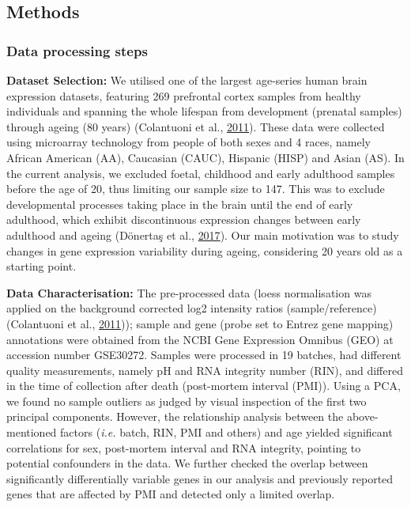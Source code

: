 \documentclass[12pt,twoside]{unicam}
\begin{document}
\hypertarget{veronikaMethods}{%
\subsection{Methods}\label{veronikaMethods}}

\hypertarget{data-processing-steps}{%
\subsubsection{Data processing steps}\label{data-processing-steps}}

\textbf{Dataset Selection:} We utilised one of the largest age-series human brain expression datasets, featuring 269 prefrontal cortex samples from healthy individuals and spanning the whole lifespan from development (prenatal samples) through ageing (80 years) (Colantuoni et al., \protect\hyperlink{ref-Colantuoni2011}{2011}). These data were collected using microarray technology from people of both sexes and 4 races, namely African American (AA), Caucasian (CAUC), Hispanic (HISP) and Asian (AS). In the current analysis, we excluded foetal, childhood and early adulthood samples before the age of 20, thus limiting our sample size to 147. This was to exclude developmental processes taking place in the brain until the end of early adulthood, which exhibit discontinuous expression changes between early adulthood and ageing (Dönertaş et al., \protect\hyperlink{ref-Donertas2017}{2017}). Our main motivation was to study changes in gene expression variability during ageing, considering 20 years old as a starting point.

\textbf{Data Characterisation:} The pre-processed data (loess normalisation was applied on the background corrected log2 intensity ratios (sample/reference)(Colantuoni et al., \protect\hyperlink{ref-Colantuoni2011}{2011})); sample and gene (probe set to Entrez gene mapping) annotations were obtained from the NCBI Gene Expression Omnibus (GEO) at accession number GSE30272. Samples were processed in 19 batches, had different quality measurements, namely pH and RNA integrity number (RIN), and differed in the time of collection after death (post-mortem interval (PMI)). Using a PCA, we found no sample outliers as judged by visual inspection of the first two principal components. However, the relationship analysis between the above-mentioned factors (\emph{i.e.} batch, RIN, PMI and others) and age yielded significant correlations for sex, post-mortem interval and RNA integrity, pointing to potential confounders in the data. We further checked the overlap between significantly differentially variable genes in our analysis and previously reported genes that are affected by PMI and detected only a limited overlap.
\end{document}
